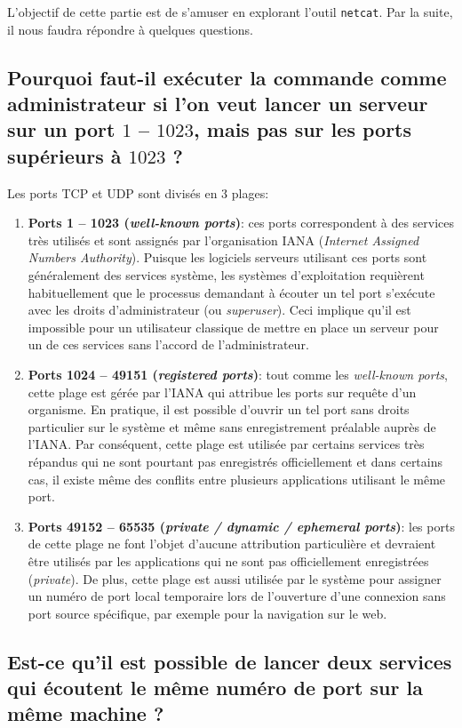 \documentclass[11pt,a4paper]{article}
\begin{document}
L'objectif de cette partie est de s'amuser en explorant l'outil \texttt{netcat}. Par la suite, il nous faudra répondre à quelques questions.

\subsection{Pourquoi faut-il exécuter la commande comme administrateur si l'on veut lancer un serveur sur un port $1$ -- $1023$, mais pas sur les ports supérieurs à $1023$ ?}

Les ports TCP et UDP sont divisés en 3 plages:
\begin{enumerate}
	\item \textbf{Ports 1 -- 1023 (\textit{well-known ports})}: ces ports correspondent à des services très utilisés et sont assignés par l'organisation IANA (\textit{Internet Assigned Numbers Authority}). Puisque les logiciels serveurs utilisant ces ports sont généralement des services système, les systèmes d'exploitation requièrent habituellement que le processus demandant à écouter un tel port s'exécute avec les droits d'administrateur (ou \textit{superuser}). Ceci implique qu'il est impossible pour un utilisateur classique de mettre en place un serveur pour un de ces services sans l'accord de l'administrateur.
	\item \textbf{Ports 1024 -- 49151 (\textit{registered ports})}: tout comme les \textit{well-known ports}, cette plage est gérée par l'IANA qui attribue les ports sur requête d'un organisme. En pratique, il est possible d'ouvrir un tel port sans droits particulier sur le système et même sans enregistrement préalable auprès de l'IANA. Par conséquent, cette plage est utilisée par certains services très répandus qui ne sont pourtant pas enregistrés officiellement et dans certains cas, il existe même des conflits entre plusieurs applications utilisant le même port.
	\item \textbf{Ports 49152 -- 65535 (\textit{private / dynamic / ephemeral ports})}: les ports de cette plage ne font l'objet d'aucune attribution particulière et devraient être utilisés par les applications qui ne sont pas officiellement enregistrées (\textit{private}). De plus, cette plage est aussi utilisée par le système pour assigner un numéro de port local temporaire lors de l'ouverture d'une connexion sans port source spécifique, par exemple pour la navigation sur le web.
\end{enumerate}

\subsection{Est-ce qu'il est possible de lancer deux services qui écoutent le même numéro de port sur la même machine ?}
\end{document}
